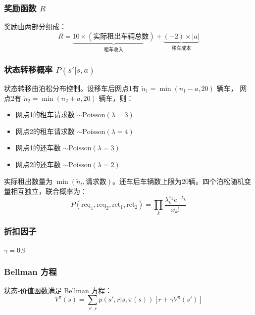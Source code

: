 \documentclass[12pt,a4paper]{ctexart}
\begin{document}
\subsubsection{奖励函数 $R$}

奖励由两部分组成：
\begin{equation}
R = \underbrace{10 \times (\text{实际租出车辆总数})}_{\text{租车收入}} + \underbrace{(-2) \times |a|}_{\text{移车成本}}
\end{equation}

\subsubsection{状态转移概率 $P(s'|s,a)$}

状态转移由泊松分布控制。设移车后网点1有 $\tilde{n}_1 = \min(n_1 - a, 20)$ 辆车，
网点2有 $\tilde{n}_2 = \min(n_2 + a, 20)$ 辆车，则：

\begin{itemize}[leftmargin=2em]
  \item 网点1的租车请求数 $\sim \text{Poisson}(\lambda=3)$
  \item 网点2的租车请求数 $\sim \text{Poisson}(\lambda=4)$
  \item 网点1的还车数 $\sim \text{Poisson}(\lambda=3)$
  \item 网点2的还车数 $\sim \text{Poisson}(\lambda=2)$
\end{itemize}

实际租出数量为 $\min(\tilde{n}_i, \text{请求数})$。还车后车辆数上限为20辆。四个泊松随机变量相互独立，联合概率为：
\begin{equation}
P(\text{req}_1, \text{req}_2, \text{ret}_1, \text{ret}_2) = \prod_{k} \frac{\lambda_k^{x_k} e^{-\lambda_k}}{x_k!}
\end{equation}

\subsubsection{折扣因子}

$\gamma = 0.9$

\subsubsection{Bellman 方程}

状态-价值函数满足 Bellman 方程：
\begin{equation}
V^{\pi}(s) = \sum_{s',r} p(s',r|s,\pi(s)) \left[ r + \gamma V^{\pi}(s') \right]
\end{equation}
\end{document}
